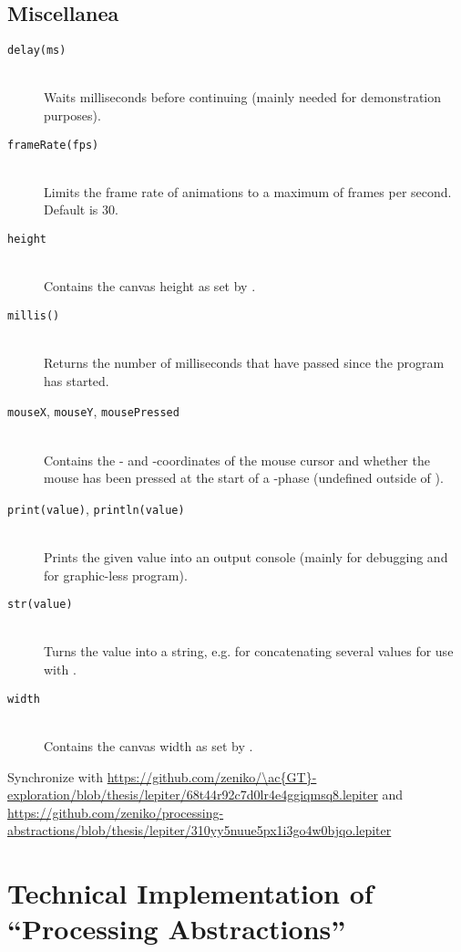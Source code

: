 \section{Miscellanea}
\begin{description}
\item[\texttt{delay(ms)}] \hfill \\
	Waits  milliseconds before continuing (mainly needed for demonstration purposes).
\item[\texttt{frameRate(fps)}] \hfill \\
	Limits the frame rate of animations to a maximum of  frames per second. Default is 30.
\item[\texttt{height}] \hfill \\
	Contains the canvas height as set by .
\item[\texttt{millis()}] \hfill \\
	Returns the number of milliseconds that have passed since the program has started.
\item[\texttt{mouseX}, \texttt{mouseY}, \texttt{mousePressed}] \hfill \\
	Contains the - and -coordinates of the mouse cursor and whether the mouse has been pressed at the start of a -phase (undefined outside of ).
\item[\texttt{print(value)}, \texttt{println(value)}] \hfill \\
	Prints the given value into an output console (mainly for debugging and for graphic-less program).
\item[\texttt{str(value)}] \hfill \\
	Turns the value into a string, e.g. for concatenating several values for use with .
\item[\texttt{width}] \hfill \\
	Contains the canvas width as set by .
\end{description}

\begin{todo}
\item Synchronize with \url{https://github.com/zeniko/\ac{GT}-exploration/blob/thesis/lepiter/68t44r92c7d0lr4e4ggiqmsq8.lepiter} and \url{https://github.com/zeniko/processing-abstractions/blob/thesis/lepiter/310yy5nuue5px1i3go4w0bjqo.lepiter}
\end{todo}




\chapter{Technical Implementation of ``Processing Abstractions''} \label{app_implementation}

